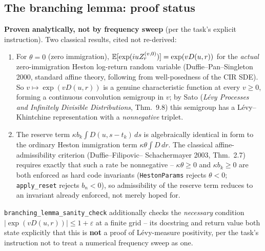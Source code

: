 \subsection{The branching lemma: proof status}
\label{sec:branching}

\textbf{Proven analytically, not by frequency sweep} (per the task's
explicit instruction). Two classical results, cited not re-derived:

\begin{enumerate}
\item For $\theta=0$ (zero immigration), $\mathbb E[\exp(iuZ_r^{(v,0)})]=\exp(vD(u,r))$
  for the \emph{actual} zero-immigration Heston log-return random variable
  (Duffie--Pan--Singleton 2000, standard affine theory, following from
  well-posedness of the CIR SDE). So $v\mapsto\exp(vD(u,r))$ is a genuine
  characteristic function at every $v\ge0$, forming a continuous convolution
  semigroup in $v$; by Sato (\emph{L\'evy Processes and Infinitely Divisible
  Distributions}, Thm.~9.8) this semigroup has a L\'evy--Khintchine
  representation with a \emph{nonnegative} triplet.
\item The reserve term $\kappa b_k\int D(u,s-t_k)\,ds$ is algebraically
  identical in form to the ordinary Heston immigration term $\kappa\theta\int
  D\,dr$. The classical affine-admissibility criterion (Duffie--Filipovic--
  Schachermayer 2003, Thm.~2.7) requires exactly that such a rate be
  nonnegative -- $\kappa\theta\ge0$ and $\kappa b_k\ge0$ are both enforced as
  hard code invariants (\texttt{HestonParams} rejects $\theta<0$;
  \texttt{apply\_reset} rejects $b_n<0$), so admissibility of the reserve
  term reduces to an invariant already enforced, not merely hoped for.
\end{enumerate}

\texttt{branching\_lemma\_sanity\_check} additionally checks the
\emph{necessary} condition $|\exp(vD(u,r))|\le1+\varepsilon$ at a finite
grid -- its docstring and return value both state explicitly that this is
\textbf{not} a proof of L\'evy-measure positivity, per the task's
instruction not to treat a numerical frequency sweep as one.

